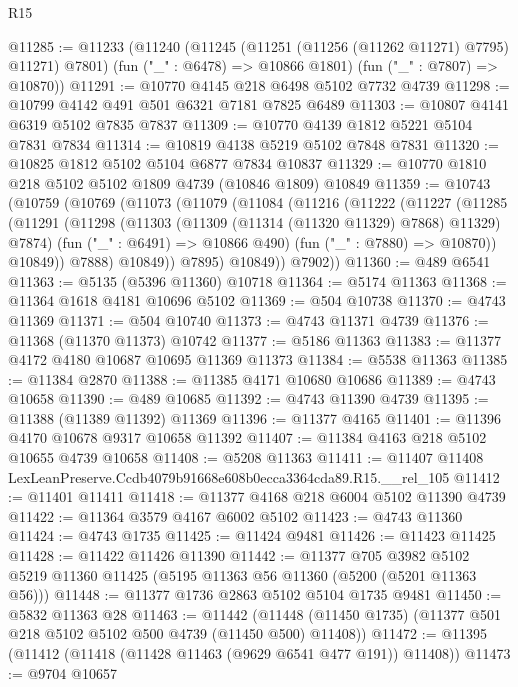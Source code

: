 \begin{lexlean}{R15}
\begin{coremodule}
{{{{{{{{{{{@11285 := @11233
    (@11240
      (@11245 (@11251 (@11256 (@11262 @11271) @7795) @11271) @7801)
      (fun ("_" : @6478) => @10866 @1801)
      (fun ("_" : @7807) => @10870))
@11291 := @10770 @4145 @218 @6498 @5102 @7732 @4739
@11298 := @10799 @4142 @491 @501 @6321 @7181 @7825 @6489
@11303 := @10807 @4141 @6319 @5102 @7835 @7837
@11309 := @10770 @4139 @1812 @5221 @5104 @7831 @7834
@11314 := @10819 @4138 @5219 @5102 @7848 @7831
@11320 := @10825 @1812 @5102 @5104 @6877 @7834 @10837
@11329 := @10770 @1810 @218 @5102 @5102 @1809 @4739 (@10846 @1809) @10849
@11359 := @10743
    (@10759
      (@10769
        (@11073
          (@11079
            (@11084
              (@11216
                (@11222
                  (@11227
                    (@11285
                      (@11291
                        (@11298
                          (@11303 (@11309 (@11314 (@11320 @11329) @7868) @11329) @7874)
                          (fun ("_" : @6491) => @10866 @490)
                          (fun ("_" : @7880) => @10870))
                        @10849))
                    @7888)
                  @10849))
              @7895)
            @10849))
        @7902))
@11360 := @489 @6541
@11363 := @5135 (@5396 @11360) @10718
@11364 := @5174 @11363
@11368 := @11364 @1618 @4181 @10696 @5102
@11369 := @504 @10738
@11370 := @4743 @11369
@11371 := @504 @10740
@11373 := @4743 @11371 @4739
@11376 := @11368 (@11370 @11373) @10742
@11377 := @5186 @11363
@11383 := @11377 @4172 @4180 @10687 @10695 @11369 @11373
@11384 := @5538 @11363
@11385 := @11384 @2870
@11388 := @11385 @4171 @10680 @10686
@11389 := @4743 @10658
@11390 := @489 @10685
@11392 := @4743 @11390 @4739
@11395 := @11388 (@11389 @11392) @11369
@11396 := @11377 @4165
@11401 := @11396 @4170 @10678 @9317 @10658 @11392
@11407 := @11384 @4163 @218 @5102 @10655 @4739 @10658
@11408 := @5208 @11363
@11411 := @11407 @11408 LexLeanPreserve.Ccdb4079b91668e608b0ecca3364cda89.R15.__rel_105
@11412 := @11401 @11411
@11418 := @11377 @4168 @218 @6004 @5102 @11390 @4739
@11422 := @11364 @3579 @4167 @6002 @5102
@11423 := @4743 @11360
@11424 := @4743 @1735
@11425 := @11424 @9481
@11426 := @11423 @11425
@11428 := @11422 @11426 @11390
@11442 := @11377
    @705
    @3982
    @5102
    @5219
    @11360
    @11425
    (@5195 @11363 @56 @11360 (@5200 (@5201 @11363 @56)))
@11448 := @11377 @1736 @2863 @5102 @5104 @1735 @9481
@11450 := @5832 @11363 @28
@11463 := @11442
    (@11448 (@11450 @1735) (@11377 @501 @218 @5102 @5102 @500 @4739 (@11450 @500) @11408))
@11472 := @11395 (@11412 (@11418 (@11428 @11463 (@9629 @6541 @477 @191)) @11408))
@11473 := @9704 @10657
}}}}}}}}}}}
\end{coremodule}
\end{lexlean}
